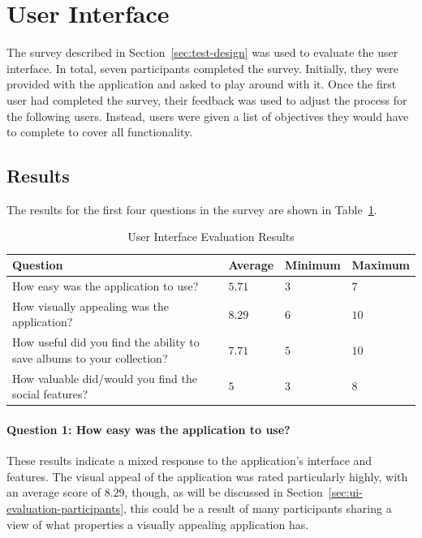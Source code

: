 \section{User Interface}
The survey described in Section~\ref{sec:test-design} was used to evaluate the user interface. In total, seven participants completed the survey. Initially, they were provided with the application and asked to play around with it. Once the first user had completed the survey, their feedback was used to adjust the process for the following users. Instead, users were given a list of objectives they would have to complete to cover all functionality.

\subsection{Results}
The results for the first four questions in the survey are shown in Table~\ref{tab:ui-evaluation-results}.
\begin{table}
    \centering
    \begin{tabular}{|m{5cm}|m{2cm}|m{2cm}|m{2cm}|}
        \hline
        \textbf{Question} & \textbf{Average} & \textbf{Minimum} & \textbf{Maximum} \\
        \hline
 How easy was the application to use? & $5.71$ & $3$ & $7$ \\
        \hline
 How visually appealing was the application? & $8.29$ & $6$ & $10$ \\
        \hline
 How useful did you find the ability to save albums to your collection? & $7.71$ & $5$ & $10$ \\
        \hline
 How valuable did/would you find the social features? & $5$ & $3$ & $8$ \\
        \hline
    \end{tabular}
    \caption{User Interface Evaluation Results}
    \label{tab:ui-evaluation-results}
\end{table}

\paragraph{Question 1: How easy was the application to use?}
These results indicate a mixed response to the application's interface and features. The visual appeal of the application was rated particularly highly, with an average score of $8.29$, though, as will be discussed in Section~\ref{sec:ui-evaluation-participants}, this could be a result of many participants sharing a view of what properties a visually appealing application has.

